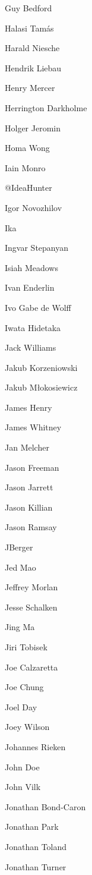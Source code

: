 \begin{DoxyItemize}
\item Guy Bedford
\item Halasi Tamás
\item Harald Niesche
\item Hendrik Liebau
\item Henry Mercer
\item Herrington Darkholme
\item Holger Jeromin
\item Homa Wong
\item Iain Monro
\item @\+Idea\+Hunter
\item Igor Novozhilov
\item Ika
\item Ingvar Stepanyan
\item Isiah Meadows
\item Ivan Enderlin
\item Ivo Gabe de Wolff
\item Iwata Hidetaka
\item Jack Williams
\item Jakub Korzeniowski
\item Jakub Młokosiewicz
\item James Henry
\item James Whitney
\item Jan Melcher
\item Jason Freeman
\item Jason Jarrett
\item Jason Killian
\item Jason Ramsay
\item JBerger
\item Jed Mao
\item Jeffrey Morlan
\item Jesse Schalken
\item Jing Ma
\item Jiri Tobisek
\item Joe Calzaretta
\item Joe Chung
\item Joel Day
\item Joey Wilson
\item Johannes Rieken
\item John Doe
\item John Vilk
\item Jonathan Bond-\/\+Caron
\item Jonathan Park
\item Jonathan Toland
\item Jonathan Turner

\end{DoxyItemize}
